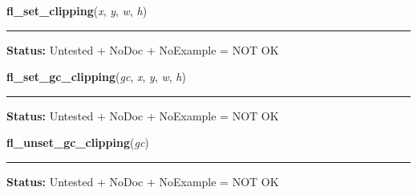     \vspace{0.5ex}

\hspace{.8\funcindent}\begin{boxedminipage}{\funcwidth}

    \raggedright \textbf{fl\_set\_clipping}(\textit{x}, \textit{y}, \textit{w}, \textit{h})

    \vspace{-1.5ex}

    \rule{\textwidth}{0.5\fboxrule}
\setlength{\parskip}{2ex}
\setlength{\parskip}{1ex}
\textbf{Status:} Untested + NoDoc + NoExample = NOT OK



    \end{boxedminipage}

    \label{xformslib:library:fl_set_gc_clipping}

    \vspace{0.5ex}

\hspace{.8\funcindent}\begin{boxedminipage}{\funcwidth}

    \raggedright \textbf{fl\_set\_gc\_clipping}(\textit{gc}, \textit{x}, \textit{y}, \textit{w}, \textit{h})

    \vspace{-1.5ex}

    \rule{\textwidth}{0.5\fboxrule}
\setlength{\parskip}{2ex}
\setlength{\parskip}{1ex}
\textbf{Status:} Untested + NoDoc + NoExample = NOT OK



    \end{boxedminipage}

    \label{xformslib:library:fl_unset_gc_clipping}

    \vspace{0.5ex}

\hspace{.8\funcindent}\begin{boxedminipage}{\funcwidth}

    \raggedright \textbf{fl\_unset\_gc\_clipping}(\textit{gc})

    \vspace{-1.5ex}

    \rule{\textwidth}{0.5\fboxrule}
\setlength{\parskip}{2ex}
\setlength{\parskip}{1ex}
\textbf{Status:} Untested + NoDoc + NoExample = NOT OK



    \end{boxedminipage}

